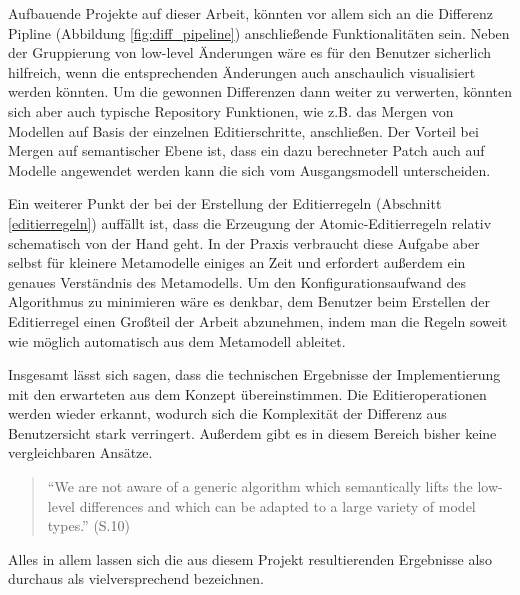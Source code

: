 Aufbauende Projekte auf dieser Arbeit, könnten vor allem sich an die Differenz Pipline 
(Abbildung \ref{fig:diff_pipeline}) anschließende Funktionalitäten sein. Neben der Gruppierung von
low-level Änderungen wäre es für den Benutzer sicherlich hilfreich, wenn die entsprechenden
Änderungen auch anschaulich visualisiert werden könnten. Um die gewonnen Differenzen dann
weiter zu verwerten, könnten sich aber auch typische Repository Funktionen, wie z.B. das Mergen von
Modellen auf Basis der einzelnen Editierschritte, anschließen. Der Vorteil bei Mergen auf
semantischer Ebene ist, dass ein dazu berechneter Patch auch auf Modelle angewendet werden kann die
sich vom Ausgangsmodell unterscheiden.

Ein weiterer Punkt der bei der Erstellung der Editierregeln (Abschnitt \ref{editierregeln}) auffällt
ist, dass die Erzeugung der Atomic-Editierregeln relativ schematisch von der Hand geht. In der
Praxis verbraucht diese Aufgabe aber selbst für kleinere Metamodelle einiges an Zeit und erfordert
außerdem ein genaues Verständnis des Metamodells. Um den Konfigurationsaufwand des Algorithmus zu
minimieren wäre es denkbar, dem Benutzer beim Erstellen der Editierregel einen Großteil der Arbeit
abzunehmen, indem man die Regeln soweit wie möglich automatisch aus dem Metamodell ableitet.

Insgesamt lässt sich sagen, dass die technischen Ergebnisse der Implementierung mit den erwarteten
aus dem Konzept \cite{KeKT2011ASE} übereinstimmen. Die Editieroperationen werden wieder erkannt,
wodurch sich die Komplexität der Differenz aus Benutzersicht stark verringert. Außerdem gibt es in
diesem Bereich bisher keine vergleichbaren Ansätze.
\begin{quote}
"`We are not aware of a generic algorithm which semantically lifts the low-level differences and
which can be adapted to a large variety of model types."' \cite{KeKT2011ASE} (S.10)
\end{quote}
Alles in allem lassen sich die aus diesem Projekt resultierenden Ergebnisse also durchaus als
vielversprechend bezeichnen.
